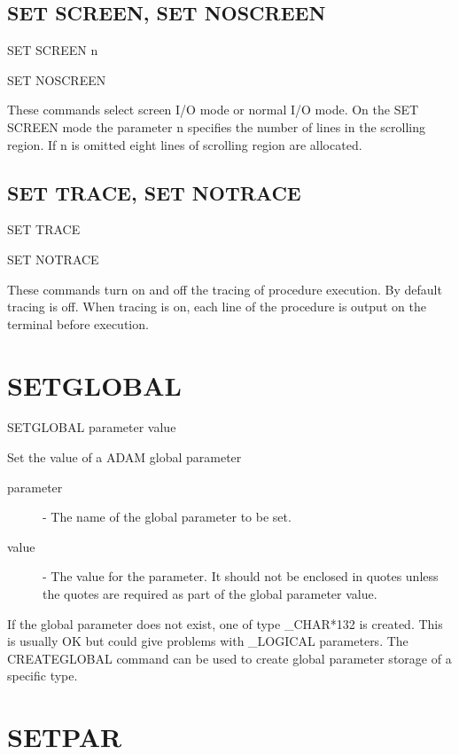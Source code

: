 \subsection{SET SCREEN, SET NOSCREEN}

   SET SCREEN n

   SET NOSCREEN

These commands select screen I/O mode or normal I/O mode. On the SET SCREEN
mode the parameter n specifies the number of lines in the scrolling region.
If n is omitted eight lines of scrolling region are allocated.

\subsection{SET TRACE, SET NOTRACE}

   SET TRACE

   SET NOTRACE

These commands turn on and off the tracing of procedure execution. By 
default tracing is off. When tracing is on, each line of the procedure is 
output on the terminal before execution.



\section{SETGLOBAL}

   SETGLOBAL \hspace{.5cm}  parameter \hspace{.5cm} value

Set the value of a ADAM global parameter

\begin{description}

\item[parameter] - The name of the global parameter to be set.

\item[value] - The value for the parameter. It should not be enclosed in quotes
unless the quotes are required as part of the global parameter value.

\end{description}
If the global parameter does not exist, one of type \_CHAR*132 is created.
This is usually OK but could give problems with \_LOGICAL parameters.
The CREATEGLOBAL command can be used to create global parameter storage of a 
specific type.

\section{SETPAR}

